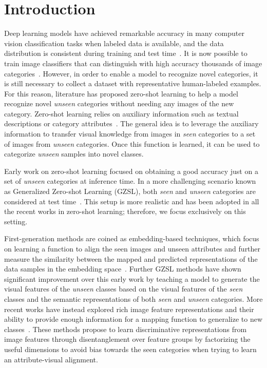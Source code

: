 \section{Introduction}

Deep learning models have achieved remarkable accuracy in many computer vision classification tasks when labeled data is available, and the data distribution is consistent during training and test time~\cite{effectivenessData, revisitEffectivenessData, Ren2015FasterRT}. It is now possible to train image classifiers that can distinguish with high accuracy thousands of image categories~\cite{Russakovsky2015ImageNetLS}. 
However, in order to enable a model to recognize novel categories, it is still necessary to collect a dataset with representative human-labeled examples.
For this reason, literature has proposed zero-shot learning to help a model recognize novel {\em unseen} categories without needing any images of the new category. Zero-shot learning relies on auxiliary information such as textual descriptions or category attributes~\cite{5206772,elhoseiny2013write,lampert2013attribute}. 
The general idea is to leverage the auxiliary information to transfer visual knowledge from images in {\em seen} categories to a set of images from {\em unseen} categories. 
Once this function is learned, it can be used to categorize {\em unseen} samples into novel classes.


Early work on zero-shot learning focused on obtaining a good accuracy just on a set of {\em unseen} categories at inference time. In a more challenging scenario known as Generalized Zero-shot Learning (GZSL), both {\em seen} and {\em unseen} categories are considered at test time~\cite{Chao2016AnES, Pourpanah2020ARO}. This setup is more realistic and has been adopted in all the recent works in zero-shot learning; therefore, we focus exclusively on this setting.

First-generation methods are coined as embedding-based techniques, which focus on learning a function to align the seen images and unseen attributes and further measure the similarity between the mapped and predicted representations of the data samples in the embedding space~\cite{ESZSL, ALE, Zhang2017LearningAD, Zhang2020TowardsED}.
Further GZSL methods have shown significant improvement over this early work by teaching a model to generate the visual features of the {\em unseen} classes based on the visual features of the {\em seen} classes and the semantic representations of both {\em seen} and {\em unseen} categories. 
More recent works have instead explored rich image feature representations and their ability to provide enough information for a mapping function to generalize to new classes~\cite{Tong2019HierarchicalDO, SDGZSL}. 
These methods propose to learn discriminative representations from image features through disentanglement over feature groups by factorizing the useful dimensions to avoid bias towards the seen categories when trying to learn an attribute-visual alignment.

